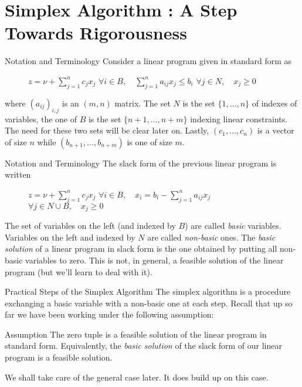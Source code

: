 \documentclass[32pt, aspectratio = 169]{beamer}
\begin{document}
\section{Simplex Algorithm : A Step Towards Rigorousness}

\begin{frame}{Notation and Terminology}
    Consider a linear program given in standard form as
    \begin{figure}
        \begin{linearProgG}{
            ${\displaystyle z = \nu + \sum_{j=1}^n c_jx_j}$
            }{
            ${\displaystyle \forall i \in B, \quad \sum_{j=1}^n a_{ij}x_j \leq b_i}$
            }{
            $\forall j \in N, \quad x_j \geq 0$
            }
        \end{linearProgG}
    \end{figure}
    where $(a_{ij})_{i, j}$ is an $(m, n)$ matrix. The set $N$ is the set $\{ 1, \ldots, n \}$ of indexes of variables, the one of $B$ is the set $\{ n+1, \ldots, n+m \}$ indexing linear constraints. The need for these two sets will be clear later on. Lastly, $(c_1, \ldots, c_n)$ is a vector of size $n$ while $(b_{n+1}, \ldots, b_{n+m})$ is one of size $m$.
\end{frame}

\begin{frame}{Notation and Terminology}
    The slack form of the previous linear program is written
    \begin{figure}
        \begin{linearProgG}{
            ${\displaystyle z = \nu + \sum_{j=1}^n c_jx_j}$
            }{
            ${\displaystyle \forall i \in B, \quad x_i = b_i - \sum_{j=1}^n a_{ij}x_j}$
            }{
            $\forall j \in N\cup B, \quad x_j \geq 0$
            }
        \end{linearProgG}
    \end{figure}
    The set of variables on the left (and indexed by $B$) are called \emph{basic} variables. Variables on the left and indexed by $N$ are called \emph{non-basic} ones. The \emph{basic solution} of a linear program in slack form is the one obtained by putting all non-basic variables to zero. This is not, in general, a feasible solution of the linear program (but we'll learn to deal with it).
\end{frame}

\begin{frame}{Practical Steps of the Simplex Algorithm}
    The simplex algorithm is a procedure exchanging a basic variable with a non-basic one at each step. Recall that up so far we have been working under the following assumption:
    \begin{alertblock}{Assumption}
        The zero tuple is a feasible solution of the linear program in standard form. Equivalently, the \textit{basic solution} of the slack form of our linear program is a feasible solution.
    \end{alertblock}
    We shall take care of the general case later. It does build up on this case.
\end{frame}
\end{document}

